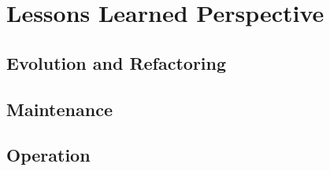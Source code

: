 \section{Lessons Learned Perspective}
\subsection{Evolution and Refactoring}
\subsection{Maintenance}
\subsection{Operation}